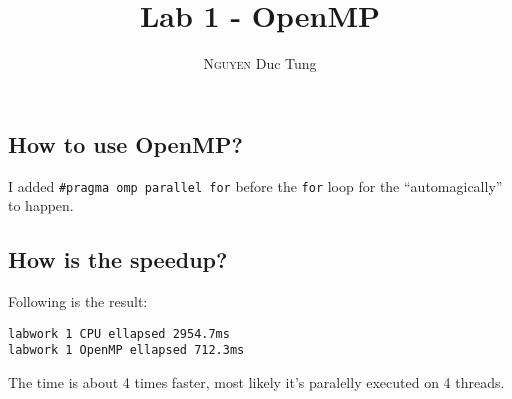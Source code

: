 \documentclass[12pt]{article}
\title{Lab 1 - OpenMP}
\author{\textsc{Nguyen} Duc Tung}
\date{}
\begin{document}
\maketitle

\subsection*{How to use OpenMP?}
I added \colorbox{backcolour}{\lstinline{#pragma omp parallel for}} before the \colorbox{backcolour}{\lstinline{for}} loop for the ``automagically'' to happen.

\subsection*{How is the speedup?}
Following is the result:

\begin{lstlisting}
labwork 1 CPU ellapsed 2954.7ms
labwork 1 OpenMP ellapsed 712.3ms
\end{lstlisting}

The time is about 4 times faster, most likely it's paralelly executed on 4 threads.
\end{document}
